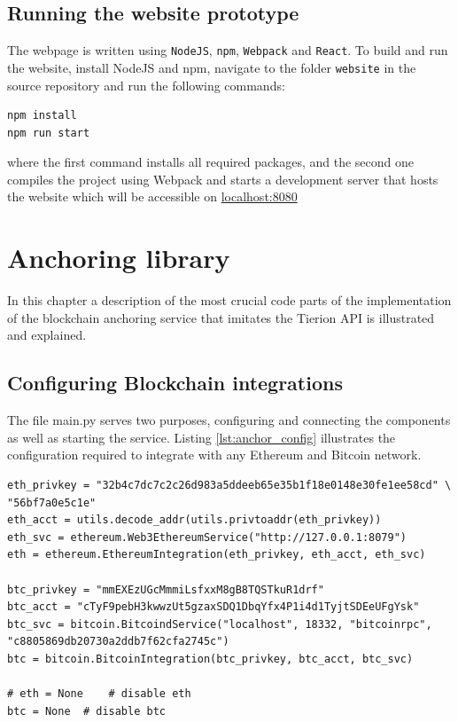 \documentclass[12pt,msc,a4paper,oneside]{ucl_thesis}
\begin{document}
\section{Running the website prototype}
The webpage is written using \texttt{NodeJS}, \texttt{npm}, \texttt{Webpack} and \texttt{React}. To build and run the website, install NodeJS and npm, navigate to the folder \texttt{website} in the source repository and run the following commands:
\begin{Code}
\begin{lstlisting}[style=myBash, caption=Set-up and run the website]
npm install
npm run start
\end{lstlisting}
\end{Code}
\noindent where the first command installs all required packages, and the second one compiles the project using Webpack and starts a development server that hosts the website which will be accessible on \url{localhost:8080}

\chapter{Anchoring library} \label{appendix:anchoring_snippets}
In this chapter a description of the most crucial code parts of the implementation of the blockchain anchoring service that imitates the Tierion API is illustrated and explained.

\section{Configuring Blockchain integrations} \label{sec:configure_bc_integration}
The file main.py serves two purposes, configuring and connecting the components as well as starting the service. Listing \ref{lst:anchor_config} illustrates the configuration required to integrate with any Ethereum and Bitcoin network.
\begin{Code}
\begin{lstlisting}[style=myPython, caption=Configuration example main.py, label=lst:anchor_config]
eth_privkey = "32b4c7dc7c2c26d983a5ddeeb65e35b1f18e0148e30fe1ee58cd" \ "56bf7a0e5c1e"
eth_acct = utils.decode_addr(utils.privtoaddr(eth_privkey))
eth_svc = ethereum.Web3EthereumService("http://127.0.0.1:8079")
eth = ethereum.EthereumIntegration(eth_privkey, eth_acct, eth_svc)

btc_privkey = "mmEXEzUGcMmmiLsfxxM8gB8TQSTkuR1drf"
btc_acct = "cTyF9pebH3kwwzUt5gzaxSDQ1DbqYfx4P1i4d1TyjtSDEeUFgYsk"
btc_svc = bitcoin.BitcoindService("localhost", 18332, "bitcoinrpc", "c8805869db20730a2ddb7f62cfa2745c")
btc = bitcoin.BitcoinIntegration(btc_privkey, btc_acct, btc_svc)

# eth = None    # disable eth
btc = None  # disable btc
\end{lstlisting}
\end{Code}
\end{document}

